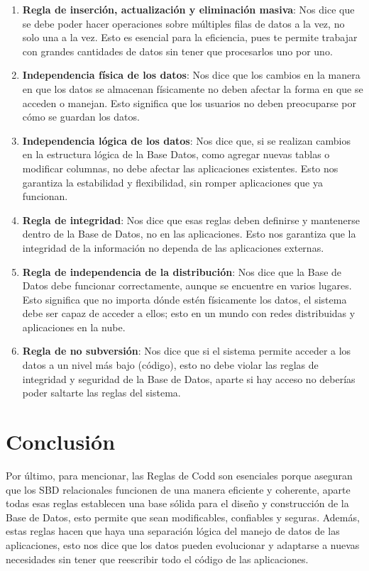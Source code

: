 \begin{enumerate}
    \item \textbf{Regla de inserción, actualización y eliminación masiva}: Nos dice que se debe poder hacer operaciones sobre múltiples filas de datos a la vez, no solo una a la vez. Esto es esencial para la eficiencia, pues te permite trabajar con grandes cantidades de datos sin tener que procesarlos uno por uno.

    \item \textbf{Independencia física de los datos}: Nos dice que los cambios en la manera en que los datos se almacenan físicamente no deben afectar la forma en que se acceden o manejan. Esto significa que los usuarios no deben preocuparse por cómo se guardan los datos.

    \item \textbf{Independencia lógica de los datos}: Nos dice que, si se realizan cambios en la estructura lógica de la Base Datos, como agregar nuevas tablas o modificar columnas, no debe afectar las aplicaciones existentes. Esto nos garantiza la estabilidad y flexibilidad, sin romper aplicaciones que ya funcionan.

    \item \textbf{Regla de integridad}: Nos dice que esas reglas deben definirse y mantenerse dentro de la Base de Datos, no en las aplicaciones. Esto nos garantiza que la integridad de la información no dependa de las aplicaciones externas.

    \item \textbf{Regla de independencia de la distribución}: Nos dice que la Base de Datos debe funcionar correctamente, aunque se encuentre en varios lugares. Esto significa que no importa dónde estén físicamente los datos, el sistema debe ser capaz de acceder a ellos; esto en un mundo con redes distribuidas y aplicaciones en la nube.

    \item \textbf{Regla de no subversión}: Nos dice que si el sistema permite acceder a los datos a un nivel más bajo (código), esto no debe violar las reglas de integridad y seguridad de la Base de Datos, aparte si hay acceso no deberías poder saltarte las reglas del sistema.
\end{enumerate}

\section{Conclusión}

Por último, para mencionar, las Reglas de Codd son esenciales porque aseguran que los SBD relacionales funcionen de una manera eficiente y coherente, aparte todas esas reglas establecen una base sólida para el diseño y construcción de la Base de Datos, esto permite que sean modificables, confiables y seguras. Además, estas reglas hacen que haya una separación lógica del manejo de datos de las aplicaciones, esto nos dice que los datos pueden evolucionar y adaptarse a nuevas necesidades sin tener que reescribir todo el código de las aplicaciones.
